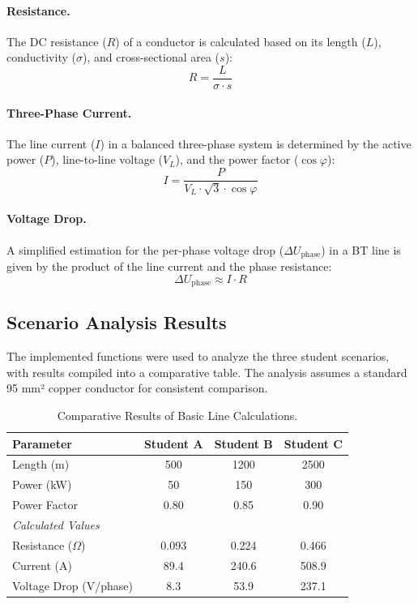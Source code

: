 \documentclass[12pt, a4paper]{article}
\begin{document}
\paragraph{Resistance.} The DC resistance ($R$) of a conductor is calculated based on its length ($L$), conductivity ($\sigma$), and cross-sectional area ($s$):
\[ R = \frac{L}{\sigma \cdot s} \]

\paragraph{Three-Phase Current.} The line current ($I$) in a balanced three-phase system is determined by the active power ($P$), line-to-line voltage ($V_L$), and the power factor ($\cos\varphi$):
\[ I = \frac{P}{V_L \cdot \sqrt{3} \cdot \cos\varphi} \]

\paragraph{Voltage Drop.} A simplified estimation for the per-phase voltage drop ($\Delta U_{\text{phase}}$) in a BT line is given by the product of the line current and the phase resistance:
\[ \Delta U_{\text{phase}} \approx I \cdot R \]

\subsection{Scenario Analysis Results}
The implemented functions were used to analyze the three student scenarios, with results compiled into a comparative table. The analysis assumes a standard 95 mm² copper conductor for consistent comparison.

\begin{table}[h!]
    \centering
    \caption{Comparative Results of Basic Line Calculations.}
    \label{tab:calc_results}
    \begin{tabular}{l c c c}
        \toprule
        \textbf{Parameter} & \textbf{Student A} & \textbf{Student B} & \textbf{Student C} \\
        \midrule
        Length (m) & 500 & 1200 & 2500 \\
        Power (kW) & 50 & 150 & 300 \\
        Power Factor & 0.80 & 0.85 & 0.90 \\
        \midrule
        \textit{Calculated Values} & & & \\
        Resistance ($\Omega$) & 0.093 & 0.224 & 0.466 \\
        Current (A) & 89.4 & 240.6 & 508.9 \\
        Voltage Drop (V/phase) & 8.3 & 53.9 & 237.1 \\
        \bottomrule
    \end{tabular}
\end{table}
\end{document}
